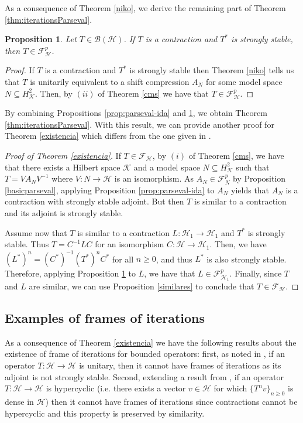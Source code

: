 \documentclass[a4paper,12pt]{amsart}
\def\cF{{\mathcal{F}}}
\def\HH{{\mathcal{H}}}
\def\KK{{\mathcal{K}}}
\def\cF{{\mathcal{F}}}
\newtheorem{proposition}[theorem]{Proposition}
\theoremstyle{definition}
\begin{document}
As a consequence of Theorem \ref{niko}, we derive the remaining part of Theorem \ref{thm:iterationsParseval}. 

\begin{proposition}\label{prop:parseval-vuelta}
Let $T\in\mathcal B(\mathcal H)$. If $T$ is a contraction and $T^*$ is strongly stable, then $T\in\cF^{p}_\HH$.
\end{proposition}
\begin{proof}
If $T$ is a contraction and $T^*$ is strongly stable then Theorem \ref{niko} tells us that $T$ is unitarily equivalent to a shift compression $A_N$ for some model space $N\subseteq H^2_\KK$. Then, by $(ii)$ of Theorem \ref{cms} we have that $T\in\cF^{p}_\HH$.
\end{proof}

By combining Propositions \ref{prop:parseval-ida} and \ref{prop:parseval-vuelta}, we obtain Theorem \ref{thm:iterationsParseval}. With this result, we can provide another proof for Theorem \ref{existencia} which differs from the one given in \cite{CMPP20}.

\begin{proof} [Proof of Theorem \ref{existencia}]
If $T\in\cF_\HH$, by $(i)$ of Theorem \ref{cms}, we have that there exists a Hilbert space $\KK$ and a model space $N\subseteq H^2_\KK$ such that $T=VA_NV^{-1}$ where $V:N\to\HH$ is an isomorphism. As $A_N\in\cF^p_N$ by Proposition \ref{basicparseval}, applying Proposition \ref{prop:parseval-ida} to $A_N$ yields that $A_N$ is a contraction with strongly stable adjoint. But then $T$ is similar to a contraction and its adjoint is strongly stable.

Assume now that $T$ is similar to a contraction $L:\HH_1\to\HH_1$ and $T^*$ is strongly stable. Thus $T=C^{-1}LC$ for an isomorphism $C:\HH\to\HH_1$. Then, we have $(L^{*})^n=(C^*)^{-1}(T^*)^nC^*$ for all $n\geqslant0$, and thus $L^{*}$ is also strongly stable. Therefore, applying Proposition \ref{prop:parseval-vuelta} to $L$, we have that $L\in\cF^{p}_{\HH_1}$. Finally, since $T$ and $L$ are similar, we can use Proposition \ref{similares} to conclude that $T\in\cF_\HH$.
\end{proof}


\subsection{Examples of frames of iterations}
As a consequence of Theorem \ref{existencia} we have the following results about the existence of frame of iterations for bounded operators: first, as noted in \cite{AP17}, if an operator $T:\HH\to\HH$ is unitary, then it cannot have frames of iterations as its adjoint is not strongly stable. Second, extending a result from \cite{CH23}, if an operator $T:\HH\to\HH$ is hypercyclic (i.e. there exists a vector $v\in\HH$ for which $\{T^nv\}_{n\geqslant0}$ is dense in $\HH$) then it cannot have frames of iterations since contractions cannot be hypercyclic and this property is preserved by similarity.
\end{document}
